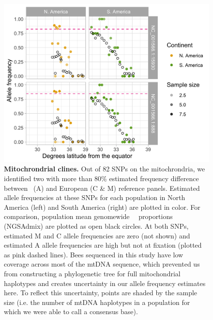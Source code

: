 \begin{figure}[ht]
\includegraphics[width=\textwidth]{chapter1/figures/mtdna_snp_clines.png}
\caption{ \textbf{Mitochrondrial clines.} Out of 82 SNPs on the mitochrondria, we identified two with more than 80\% estimated frequency difference between \scutellata\ (A) and European (C \& M) reference panels. Estimated allele frequencies at these SNPs for each population in North America (left) and South America (right) are plotted in color. For comparison, population mean genomewide \A\ \anc\ proportions (NGSAdmix) are plotted as open black circles. At both SNPs, estimated M and C allele frequencies are zero (not shown) and estimated A allele frequencies are high but not at fixation (plotted as pink dashed lines). Bees sequenced in this study have low coverage across most of the mtDNA sequence, which prevented us from constructing a phylogenetic tree for full mitochondrial haplotypes and creates uncertainty in our allele frequency estimates here. To reflect this uncertainty, points are shaded by the sample size (i.e. the number of mtDNA haplotypes in a population for which we were able to call a consensus base).}
\label{mtdna_snps}
\end{figure}
